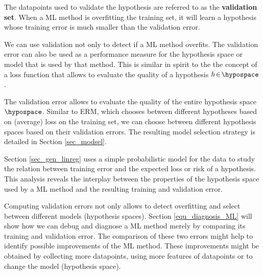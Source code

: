 \documentclass[12pt]{report}
\begin{document}
The datapoints used to validate the hypothesis are referred to as the 
{\bf validation set}. When a ML method is overfitting the training set, 
it will learn a hypothesis whose training error is much smaller than 
the validation error. 
%
%

We can use validation not only to detect if a ML method overfits. 
The validation error can also be used as a performance measure 
for the hypothesis space or model that is used by that method. 
This is similar in spirit to the the concept of a loss function that 
allows to evaluate the quality of a hypothesis $h\!\in\!\hypospace$. 

The validation error allows to evaluate the quality of the entire hypothesis 
space $\hypospace$. Similar to ERM, which chooses between different 
hypotheses based on (average) loss on the training set, we can choose 
between different hypothesis spaces based on their validation errors. 
The resulting model selection strategy is detailed in Section \ref{sec_modsel}. 

Section \ref{sec_gen_linreg} uses a simple probabilistic model for the 
data to study the relation between training error and the expected loss 
or risk of a hypothesis. This analysis reveals the interplay between the 
properties of the hypothesis space used by a ML method and the resulting 
training and validation error.

Computing validation errors not only allows to detect overfitting and 
select between different models (hypothesis spaces). Section \ref{equ_diagnosis_ML} 
will show how we can debug and diagnose a ML method merely by 
comparing its training and validation error. The comparison of these 
two errors might help to identify possible improvements of the ML method. 
These improvements might be obtained by collecting more datapoints, 
using more features of datapoints or to change the model (hypothesis space). 
\end{document}
